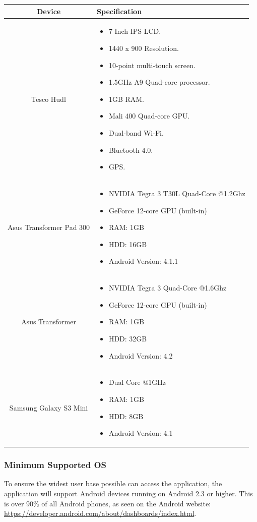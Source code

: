 \documentclass[11pt,a4paper]{article}
\begin{document}
\begin{center}
\begin{tabular}{c|p{8cm}}
\textbf{Device} & \textbf{Specification} \\ \hline
Tesco Hudl & \begin{itemize}
\item 7 Inch IPS LCD.
\item 1440 x 900 Resolution.
\item 10-point multi-touch screen.
\item 1.5GHz A9 Quad-core processor.
\item 1GB RAM.
\item Mali 400 Quad-core GPU.
\item Dual-band Wi-Fi.
\item Bluetooth 4.0.
\item GPS.
\end{itemize} \\ \hline
Asus Transformer Pad 300 & 	\begin{itemize}
	\item NVIDIA Tegra 3 T30L Quad-Core @1.2Ghz
	\item GeForce 12-core GPU (built-in)
	\item RAM: 1GB
	\item HDD: 16GB
	\item Android Version: 4.1.1
	\end{itemize} \\ \hline
Asus Transformer & \begin{itemize}
	\item NVIDIA Tegra 3 Quad-Core @1.6Ghz
	\item GeForce 12-core GPU (built-in)
	\item RAM: 1GB
	\item HDD: 32GB
	\item Android Version: 4.2
\end{itemize} \\ \hline
Samsung Galaxy S3 Mini & \begin{itemize}
\item Dual Core @1GHz
\item RAM: 1GB
\item HDD: 8GB
\item Android Version: 4.1
\end{itemize} \\ \hline
\end{tabular}
\end{center}

\subsubsection{Minimum Supported OS}
To ensure the widest user base possible can access the application, the application will support Android devices running on Android 2.3 or higher. This is over 90\% of all Android phones, as seen on the Android website: \url{https://developer.android.com/about/dashboards/index.html}.
\end{document}
